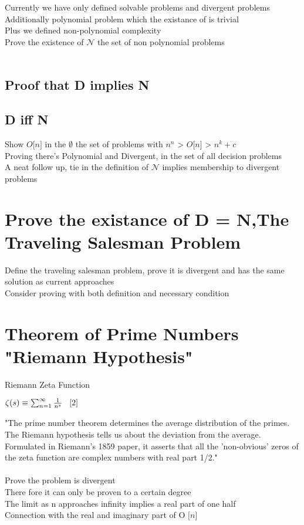\documentclass[11pt]{article}
\begin{document}
Currently we have only defined solvable problems and divergent problems\\
Additionally polynomial problem which the existance of is trivial\\
Plus we defined non-polynomial complexity\\
Prove the existence of $\mathcal{N}$ the set of non polynomial problems\\
\\

\subsection{Proof that D implies N}
\subsection{D iff N}

Show  $O \lbrack n \rbrack$ in the $\emptyset$ the set of problems with    $n^n$ > $O \lbrack n \rbrack$ > $n^k + c$\\
Proving there's Polynomial and Divergent, in the set of all decision problems\\


A neat follow up, tie in the definition of $\mathcal{N}$ implies membership to divergent problems


\newpage

\section{Prove the existance of D = N,The Traveling Salesman Problem}
Define the traveling salesman problem, prove it is divergent and has the same solution as current approaches\\
Consider proving with both definition and necessary condition\\







\newpage
\section{Theorem of Prime Numbers "Riemann Hypothesis"}
Riemann Zeta Function
\begin{center}
$
\zeta (s) \equiv \sum_{n=1}^{\infty} \frac{1}{n^s} \hspace{3mm} \lbrack 2 \rbrack
$
\end{center}
"The prime number theorem determines the average distribution of the primes. The Riemann hypothesis tells us about the deviation from the average. Formulated in Riemann's 1859 paper, it asserts that all the 'non-obvious' zeros of the zeta function are complex numbers with real part 1/2." \rbrack\\
\\
Prove the problem is divergent\\
There fore it can only be proven to a certain degree\\
The limit as n approaches infinity implies a real part of one half\\
Connection with the real and imaginary part of O $\lbrack n \rbrack$
\end{document}
